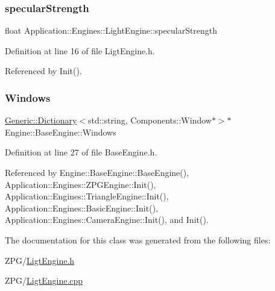 \mbox{\label{classApplication_1_1Engines_1_1LightEngine_a97dc7516071da727bcbb137e0cb75301}} 
\subsubsection{\texorpdfstring{specular\+Strength}{specularStrength}}
{\footnotesize\ttfamily float Application\+::\+Engines\+::\+Light\+Engine\+::specular\+Strength}



Definition at line 16 of file Ligt\+Engine.\+h.



Referenced by Init().

\mbox{\label{classEngine_1_1BaseEngine_a4a1a4c4dae052e66ecc4f326eeed4d33}} 
\subsubsection{\texorpdfstring{Windows}{Windows}}
{\footnotesize\ttfamily \mbox{\hyperlink{classGeneric_1_1Dictionary}{Generic\+::\+Dictionary}}$<$std\+::string, Components\+::\+Window$\ast$$>$$\ast$ Engine\+::\+Base\+Engine\+::\+Windows\hspace{0.3cm}{\ttfamily [inherited]}}



Definition at line 27 of file Base\+Engine.\+h.



Referenced by Engine\+::\+Base\+Engine\+::\+Base\+Engine(), Application\+::\+Engines\+::\+Z\+P\+G\+Engine\+::\+Init(), Application\+::\+Engines\+::\+Triangle\+Engine\+::\+Init(), Application\+::\+Engines\+::\+Basic\+Engine\+::\+Init(), Application\+::\+Engines\+::\+Camera\+Engine\+::\+Init(), and Init().



The documentation for this class was generated from the following files\+:\begin{DoxyCompactItemize}
\item 
Z\+P\+G/\mbox{\hyperlink{LigtEngine_8h}{Ligt\+Engine.\+h}}\item 
Z\+P\+G/\mbox{\hyperlink{LigtEngine_8cpp}{Ligt\+Engine.\+cpp}}\end{DoxyCompactItemize}
